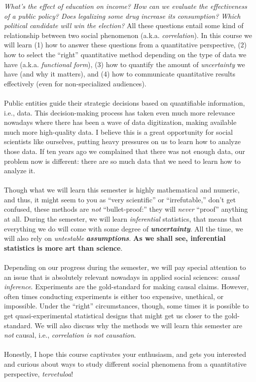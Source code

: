 \documentclass[letterpaper]{article}
\begin{document}
\emph{What's the effect of education on income? How can we evaluate the effectiveness of a public policy? Does legalizing some drug increase its consumption? Which political candidate will win the election?} All these questions entail some kind of relationship between two social phenomenon (a.k.a. \emph{correlation}). In this course we will learn (1) how to answer these questions from a quantitative perspective, (2) how to select the ``right'' quantitative method depending on the type of data we have (a.k.a. \emph{functional form}), (3) how to quantify the amount of \emph{uncertainty} we have (and why it matters), and (4) how to communicate quantitative results effectively (even for non-specialized audiences). 
\\
\\
Public entities guide their strategic decisions based on quantifiable information, i.e., data. This decision-making process has taken even much more relevance nowadays where there has been a wave of data digitization, making available much more high-quality data. I believe this is a great opportunity for social scientists like ourselves, putting heavy pressures on us to learn how to analyze those data. If ten years ago we complained that there was not enough data, our problem now is different: there are so much data that we need to learn how to analyze it.
\\
\\
Though what we will learn this semester is highly mathematical and numeric, and thus, it might seem to you as ``very scientific'' or ``irrefutable,'' don't get confused, these methods are \emph{not} ``bullet-proof:'' they will \emph{never} ``proof'' anything at all. During the semester, we will learn \emph{inferential} statistics, that means that everything we do will come with some degree of \emph{\bf uncertainty}. All the time, we will also rely on \emph{untestable} \emph{\bf assumptions}. {\bf As we shall see, inferential statistics is more art than science}.
\\
\\
Depending on our progress during the semester, we will pay special attention to an issue that is absolutely relevant nowadays in applied social sciences: \emph{causal inference}. Experiments are the gold-standard for making causal claims. However, often times conducting experiments is either too expensive, unethical, or impossible. Under the ``right'' circumstances, though, some times it is possible to get quasi-experimental statistical designs that might get us closer to the gold-standard. We will also discuss why the methods we will learn this semester are \emph{not} causal, i.e., \emph{correlation is not causation}.
\\
\\
Honestly, I hope this course captivates your enthusiasm, and gets you interested and curious about ways to study different social phenomena from a quantitative perspective, \emph{tervetuloa}!
\end{document}
